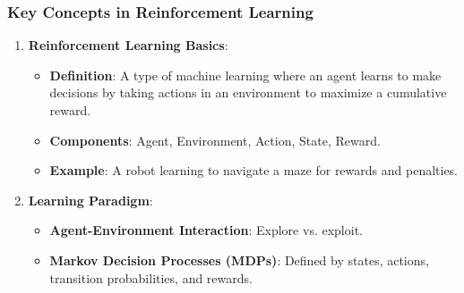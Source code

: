 \documentclass[aspectratio=169]{beamer}
\begin{document}
\begin{frame}[fragile]
    \frametitle{Key Concepts in Reinforcement Learning}
    \begin{enumerate}
        \item \textbf{Reinforcement Learning Basics}:
        \begin{itemize}
            \item \textbf{Definition}: A type of machine learning where an agent learns to make decisions by taking actions in an environment to maximize a cumulative reward.
            \item \textbf{Components}: Agent, Environment, Action, State, Reward.
            \item \textbf{Example}: A robot learning to navigate a maze for rewards and penalties.
        \end{itemize}
        
        \item \textbf{Learning Paradigm}:
        \begin{itemize}
            \item \textbf{Agent-Environment Interaction}: Explore vs. exploit.
            \item \textbf{Markov Decision Processes (MDPs)}: Defined by states, actions, transition probabilities, and rewards.
        \end{itemize}
    \end{enumerate}
\end{frame}
\end{document}
